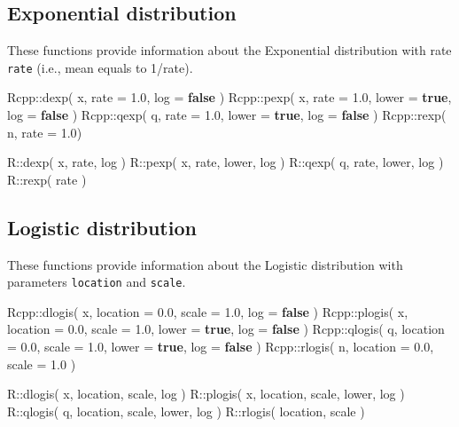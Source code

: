 \documentclass[]{book}
\newenvironment{Shaded}{\begin{snugshade}}{\end{snugshade}}
\newcommand{\KeywordTok}[1]{\textcolor[rgb]{0.13,0.29,0.53}{\textbf{#1}}}
\newcommand{\FloatTok}[1]{\textcolor[rgb]{0.00,0.00,0.81}{#1}}
\newcommand{\NormalTok}[1]{#1}
\theoremstyle{definition}
\theoremstyle{definition}
\theoremstyle{remark}
\begin{document}
\hypertarget{exponential-distribution}{\subsection{Exponential
distribution}\label{exponential-distribution}}

These functions provide information about the Exponential distribution
with rate \texttt{rate} (i.e., mean equals to 1/rate).

\begin{Shaded}
\begin{Highlighting}[]
\NormalTok{Rcpp::dexp( x, rate = }\FloatTok{1.0}\NormalTok{,               log = }\KeywordTok{false}\NormalTok{ )}
\NormalTok{Rcpp::pexp( x, rate = }\FloatTok{1.0}\NormalTok{, lower = }\KeywordTok{true}\NormalTok{, log = }\KeywordTok{false}\NormalTok{ )}
\NormalTok{Rcpp::qexp( q, rate = }\FloatTok{1.0}\NormalTok{, lower = }\KeywordTok{true}\NormalTok{, log = }\KeywordTok{false}\NormalTok{ )}
\NormalTok{Rcpp::rexp( n, rate = }\FloatTok{1.0}\NormalTok{)}

\NormalTok{R::dexp( x, rate,        log )}
\NormalTok{R::pexp( x, rate, lower, log )}
\NormalTok{R::qexp( q, rate, lower, log )}
\NormalTok{R::rexp(    rate )}
\end{Highlighting}
\end{Shaded}

\hypertarget{logistic-distribution}{\subsection{Logistic
distribution}\label{logistic-distribution}}

These functions provide information about the Logistic distribution with
parameters \texttt{location} and \texttt{scale}.

\begin{Shaded}
\begin{Highlighting}[]
\NormalTok{Rcpp::dlogis( x, location = }\FloatTok{0.0}\NormalTok{, scale = }\FloatTok{1.0}\NormalTok{,               log = }\KeywordTok{false}\NormalTok{ )}
\NormalTok{Rcpp::plogis( x, location = }\FloatTok{0.0}\NormalTok{, scale = }\FloatTok{1.0}\NormalTok{, lower = }\KeywordTok{true}\NormalTok{, log = }\KeywordTok{false}\NormalTok{ )}
\NormalTok{Rcpp::qlogis( q, location = }\FloatTok{0.0}\NormalTok{, scale = }\FloatTok{1.0}\NormalTok{, lower = }\KeywordTok{true}\NormalTok{, log = }\KeywordTok{false}\NormalTok{ )}
\NormalTok{Rcpp::rlogis( n, location = }\FloatTok{0.0}\NormalTok{, scale = }\FloatTok{1.0}\NormalTok{ )}

\NormalTok{R::dlogis( x, location, scale,        log )}
\NormalTok{R::plogis( x, location, scale, lower, log )}
\NormalTok{R::qlogis( q, location, scale, lower, log )}
\NormalTok{R::rlogis(    location, scale )}
\end{Highlighting}
\end{Shaded}
\end{document}
